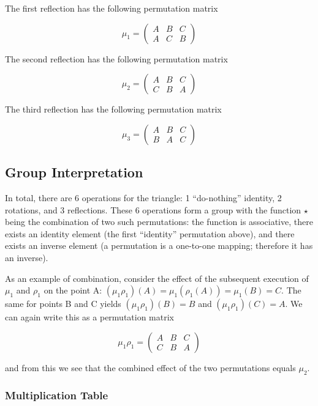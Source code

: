 The first reflection has the following permutation matrix

\[
\mu_1=\begin{pmatrix}
A & B & C\\
A & C & B\end{pmatrix}
\]

The second reflection has the following permutation matrix

\[
\mu_2=\begin{pmatrix}
A & B & C\\
C & B & A\end{pmatrix}
\]

The third reflection has the following permutation matrix

\[
\mu_3=\begin{pmatrix}
A & B & C\\
B & A & C\end{pmatrix}
\]

\subsection{Group Interpretation}\label{group-interpretation}

In total, there are 6 operations for the triangle: 1 ``do-nothing''
identity, 2 rotations, and 3 reflections. These 6 operations form a
group with the function \(\star\) being the combination of two such
permutations: the function is associative, there exists an identity
element (the first ``identity'' permutation above), and there exists an
inverse element (a permutation is a one-to-one mapping; therefore it has
an inverse).

As an example of combination, consider the effect of the subsequent
execution of \(\mu_1\) and \(\rho_1\) on the point A:
\((\mu_1 \rho_1)(A) = \mu_1(\rho_1(A)) = \mu_1(B) = C\). The same for
points B and C yields \((\mu_1 \rho_1)(B) = B\) and
\((\mu_1 \rho_1)(C) = A\). We can again write this as a permutation
matrix

\[
\mu_1 \rho_1 = \begin{pmatrix}
A & B & C\\
C & B & A\end{pmatrix}
\]

and from this we see that the combined effect of the two permutations
equals \(\mu_2\).

\subsubsection{Multiplication Table}\label{multiplication-table}

